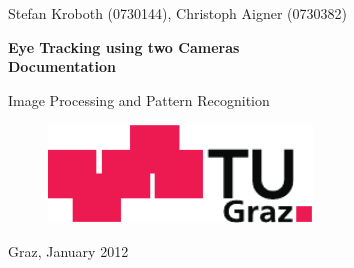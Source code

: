 \date{\today}

\begin{titlepage}
  \pagestyle{empty}
  
  \begin{center}
    {\sc\Large Stefan Kroboth (0730144), Christoph Aigner (0730382)}

    \vspace*{4cm}

    {\sffamily\bfseries\Huge Eye Tracking using two Cameras\\}
    \vspace*{0.5cm}
    {\sffamily\bfseries\Large Documentation}

    \vspace*{2cm}

    {\sc\Large Image Processing and Pattern Recognition}

    \vspace*{3cm}

    \begin{figure}[H]
      \begin{center}
        \includegraphics[width=7cm]{tug.pdf}
      \end{center}
    \end{figure}

    \vspace*{1.5cm}

    \vspace*{2cm}

    \vspace*{\fill}

    Graz, January 2012 
  \end{center}
\end{titlepage}
